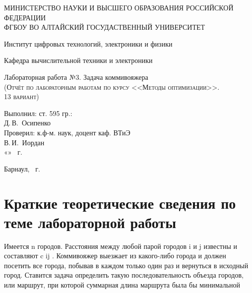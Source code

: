 \documentclass[a4paper, 12pt]{article}
\begin{document}
\begin{titlepage}
  \begin{center}
    \MakeUppercase{Министерство науки и высшего образования Российской Федерации} \\
    \MakeUppercase{ФГБОУ ВО Алтайский госудаственный университет}
    \vspace{0.25cm}
    
	  Институт цифровых технологий, электроники и физики
    
    Кафедра вычислительной техники и электроники
    \vfill
    
    {\LARGE Лабораторная работа №3. Задача коммивояжера}\\[5mm]
    \textsc{(Отчёт по лабораторным работам по курсу <<Методы оптимизации>>. \\13 вариант)}
  \bigskip

\end{center}
\vfill

\newlength{\ML}
\hfill
\begin{minipage}{0.45\textwidth}
  Выполнил: ст. 595 гр.:\\
  \underline{\hspace{\ML}} Д.\,В.~Осипенко\\
  Проверил: к.ф-м. наук, доцент каф. ВТиЭ\\
  \underline{\hspace{\ML}} В.\,И.~Иордан\\
  «\underline{\hspace{0.7cm}}» \underline{\hspace{2cm}} \the\year~г.
\end{minipage}%
\vfill

\begin{center}
  Барнаул, \the\year~г.
\end{center}
\end{titlepage}

\newpage
\section{Краткие теоретические сведения по теме лабораторной работы}
Имеется n городов. Расстояния между любой парой городов i и j известны и составляют c ij . Коммивояжер выезжает из какого-либо города и должен посетить все города, побывав в каждом только один раз и вернуться в исходный город. Ставится задача определить такую последовательность объезда городов, или маршрут, при которой суммарная длина маршрута была бы минимальной
\end{document}
